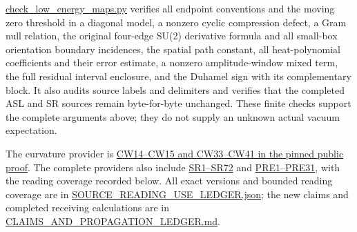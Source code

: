 \documentclass[11pt]{article}
\begin{document}
\href{https://github.com/KokunoYumeto/yang-mills-interacting-workbench/blob/main/yang-mills/continuations/20261011-central-signs-shrinking-window/check_low_energy_maps.py}{check\_low\_energy\_maps.py} verifies all endpoint conventions and the moving zero threshold in a diagonal model, a nonzero cyclic compression defect, a Gram null relation, the original four-edge SU(2) derivative formula and all small-box orientation boundary incidences, the spatial path constant, all heat-polynomial coefficients and their error estimate, a nonzero amplitude-window mixed term, the full residual interval enclosure, and the Duhamel sign with its complementary block. It also audits source labels and delimiters and verifies that the completed ASL and SR sources remain byte-for-byte unchanged. These finite checks support the complete arguments above; they do not supply an unknown actual vacuum expectation.

The curvature provider is \href{https://github.com/KokunoYumeto/yang-mills-interacting-workbench/blob/dbbcbaf7e8d50e41f7491dc9bbed1c0c6ed54b0c/yang-mills/continuations/20261011-central-signs-shrinking-window/CURVATURE_ROOTED_WORDS.md}{CW14–CW15 and CW33–CW41 in the pinned public proof}. The complete providers also include \href{https://github.com/KokunoYumeto/yang-mills-interacting-workbench/blob/5017bb93fcafa6f6282b72d076934d793a3ca6ad/yang-mills/continuations/20261011-central-signs-shrinking-window/SQUARE_ROOT_SCORE_RECEIVING_MAPS.md}{SR1–SR72} and \href{https://github.com/KokunoYumeto/yang-mills-interacting-workbench/blob/5017bb93fcafa6f6282b72d076934d793a3ca6ad/yang-mills/continuations/20261011-central-signs-shrinking-window/PHASE_RESPONSE_AND_ENDPOINT.md}{PRE1–PRE31}, with the reading coverage recorded below. All exact versions and bounded reading coverage are in \href{https://github.com/KokunoYumeto/yang-mills-interacting-workbench/blob/main/yang-mills/continuations/20261011-central-signs-shrinking-window/TEMPORAL_SPECTRAL_SOURCE_USE_LEDGER.json}{SOURCE\_READING\_USE\_LEDGER.json}; the new claims and completed receiving calculations are in \href{https://github.com/KokunoYumeto/yang-mills-interacting-workbench/blob/main/yang-mills/continuations/20261011-central-signs-shrinking-window/CLAIM_LEDGER.md}{CLAIMS\_AND\_PROPAGATION\_LEDGER.md}.
\end{document}
